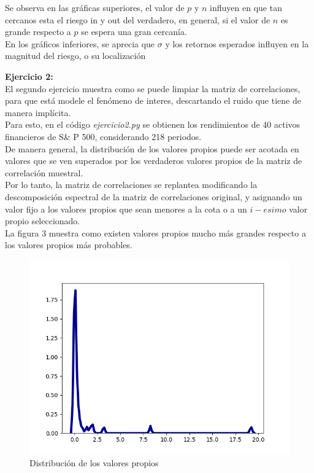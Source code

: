 \documentclass[paper=letter, fontsize=14pt]{scrartcl}
\numberwithin{equation}{section} %
\numberwithin{figure}{section} %
\numberwithin{table}{section} %
\begin{document}
Se observa en las gráficas superiores, el valor de $p$ y $n$ influyen en que tan cercanos esta el riesgo in y out del verdadero, en general, si el valor de $n$ es grande respecto a $p$ se espera una gran cercanía.\\

En los gráficos inferiores, se aprecia que $\sigma$ y los retornos esperados influyen en la magnitud del riesgo, o su localización 

\pagebreak



\textbf{Ejercicio 2:}\\

El segundo ejercicio muestra como se puede limpiar la matriz de correlaciones, para que está modele el fenómeno de interes, descartando el ruido que tiene de manera implícita.\\

Para esto, en el código \emph{ejercicio2.py} se obtienen los rendimientos de 40 activos financieros de S\& P 500, considerando 218 periodos.\\

De manera general, la distribución de los valores propios puede ser acotada en valores que se ven superados por los verdaderos valores propios de la matriz de correlación muestral.\\

Por lo tanto, la matriz de correlaciones se replantea modificando la descomposición espectral de la matriz de correlaciones original, y asignando un valor fijo a los valores propios que sean menores a la cota o a un $i-esimo$ valor propio seleccionado.\\

La figura 3 muestra como existen valores propios mucho más grandes respecto a los valores propios más probables.

\begin{figure}[h]
\centering
\includegraphics[scale=.75]{i3.png}
\caption{Distribución de los valores propios} 
\end{figure}
\pagebreak
\end{document}
